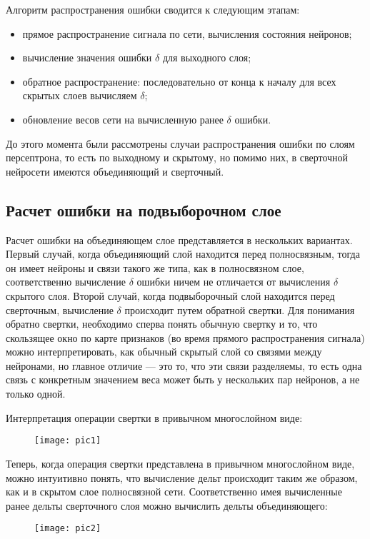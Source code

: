 \documentclass[11pt,colorlinks=true]{article}
\begin{document}
Алгоритм распространения ошибки сводится к следующим этапам:
\begin{itemize}
	\item прямое распространение сигнала по сети, вычисления состояния нейронов;
	\item вычисление значения ошибки $\delta$ для выходного слоя;
	\item обратное распространение: последовательно от конца к началу для всех скрытых слоев вычисляем $\delta$;
	\item обновление весов сети на вычисленную ранее $\delta$ ошибки.
\end{itemize}

До этого момента были рассмотрены случаи распространения ошибки по слоям персептрона, то есть по выходному и скрытому, но помимо них, в сверточной нейросети имеются объединяющий и сверточный. 

\subsection{Расчет ошибки на подвыборочном слое}

Расчет ошибки на объединяющем слое представляется в нескольких вариантах. Первый случай, когда объединяющий слой находится перед полносвязным, тогда он имеет нейроны и связи такого же типа, как в полносвязном слое, соответственно вычисление $\delta$ ошибки ничем не отличается от вычисления $\delta$ скрытого слоя. Второй случай, когда подвыборочный слой находится перед сверточным, вычисление $\delta$ происходит путем обратной свертки. Для понимания обратно свертки, необходимо сперва понять обычную свертку и то, что скользящее окно по карте признаков (во время прямого распространения сигнала) можно интерпретировать, как обычный скрытый слой со связями между нейронами, но главное отличие — это то, что эти связи разделяемы, то есть одна связь с конкретным значением веса может быть у нескольких пар нейронов, а не только одной.

 Интерпретация операции свертки в привычном многослойном виде:
 \begin{figure}[!h]
 	\begin{center}
 		\begin{minipage}[!h]{1\linewidth}
 			\texttt{[image: pic1]}
 		\end{minipage}
 	\end{center}
 \end{figure}
 
 Теперь, когда операция свертки представлена в привычном многослойном виде, можно интуитивно понять, что вычисление дельт происходит таким же образом, как и в скрытом слое полносвязной сети. Соответственно имея вычисленные ранее дельты сверточного слоя можно вычислить дельты объединяющего:
  \begin{figure}[!h]
 	\begin{center}
 		\begin{minipage}[!h]{1\linewidth}
 			\texttt{[image: pic2]}
 		\end{minipage}
 	\end{center}
 \end{figure}
 
\end{document}
